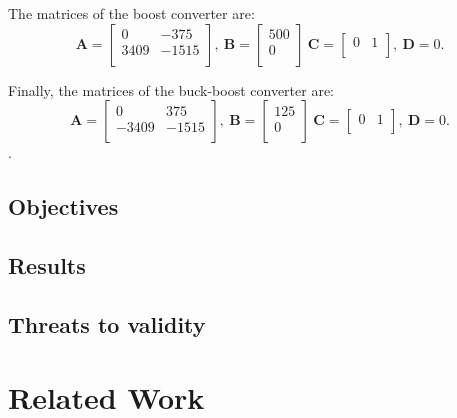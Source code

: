 \documentclass[runningheads,a4paper]{llncs}
\begin{document}
The matrices of the boost converter are:
$$
\textbf{A}=\left[\begin{array}{cc}
0		& -375 \\
3409	& -1515\\
\end{array}\right],~ \textbf{B} = \left[\begin{array}{c}
500 \\ 0 \\
\end{array}\right]~
\textbf{C}=\left[\begin{array}{cc}
0 & 1\\
\end{array}\right],~ \textbf{D}= 0.
$$

Finally, the matrices of the buck-boost converter are:
$$
\textbf{A}=\left[\begin{array}{cc}
0		& 375 \\
-3409	& -1515\\
\end{array}\right],~ \textbf{B} = \left[\begin{array}{c}
125 \\ 0 \\
\end{array}\right]~
\textbf{C}=\left[\begin{array}{cc}
0 & 1\\
\end{array}\right],~ \textbf{D}= 0.
$$.



\subsection{Objectives}

\subsection{Results}


\subsection{Threats to validity}


\section{Related Work}
\end{document}
